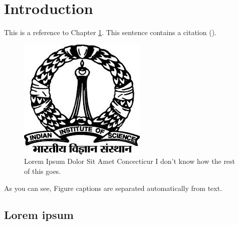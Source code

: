 \documentclass[a4paper, oneside, 11pt]{book}
\begin{document}
\chapter{Introduction}
\label{ch:intro}
\lipsum[1-2]

This is a reference to Chapter \ref{ch:intro}. This sentence contains a citation (\cite{random_citation}).

\begin{figure}
	\begin{addmargin}[0.3in]{0.3in}
	\centering
		\includegraphics{IISc_logo.jpeg}
		\caption[Short Caption Here]{\small Lorem Ipsum Dolor Sit Amet Concecticur I don't know how the rest of this goes.}

	\end{addmargin}
\end{figure}
As you can see, Figure captions are separated automatically from text. \lipsum[1-2]

\section{Lorem ipsum}
\lipsum[1-3]


\clearpage
\FloatBarrier
\backmatter
{}
\begin{singlespace}
\small
\printbibliography
\end{singlespace}
\end{document}
